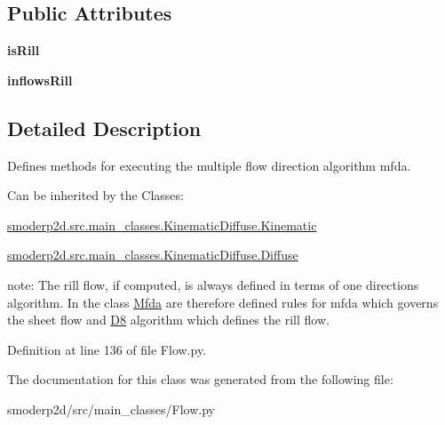 \subsection*{Public Attributes}
\begin{DoxyCompactItemize}
\item 
\hypertarget{classsmoderp2d_1_1src_1_1main__classes_1_1Flow_1_1Mfda_ac4d6e378b98d5e570bccbcb1b67c7eb8}{{\bfseries is\-Rill}}\label{classsmoderp2d_1_1src_1_1main__classes_1_1Flow_1_1Mfda_ac4d6e378b98d5e570bccbcb1b67c7eb8}

\item 
\hypertarget{classsmoderp2d_1_1src_1_1main__classes_1_1Flow_1_1Mfda_aa001d3d609b92113c5291a6935a3fc54}{{\bfseries inflows\-Rill}}\label{classsmoderp2d_1_1src_1_1main__classes_1_1Flow_1_1Mfda_aa001d3d609b92113c5291a6935a3fc54}

\end{DoxyCompactItemize}


\subsection{Detailed Description}
Defines methods for executing the multiple flow direction algorithm mfda. 

Can be inherited by the Classes\-:


\begin{DoxyItemize}
\item \hyperlink{classsmoderp2d_1_1src_1_1main__classes_1_1KinematicDiffuse_1_1Kinematic}{smoderp2d.\-src.\-main\-\_\-classes.\-Kinematic\-Diffuse.\-Kinematic}
\item \hyperlink{classsmoderp2d_1_1src_1_1main__classes_1_1KinematicDiffuse_1_1Diffuse}{smoderp2d.\-src.\-main\-\_\-classes.\-Kinematic\-Diffuse.\-Diffuse}
\end{DoxyItemize}

note\-: The rill flow, if computed, is always defined in terms of one directions algorithm. In the class \hyperlink{classsmoderp2d_1_1src_1_1main__classes_1_1Flow_1_1Mfda}{Mfda} are therefore defined rules for mfda which governs the sheet flow and \hyperlink{classsmoderp2d_1_1src_1_1main__classes_1_1Flow_1_1D8}{D8} algorithm which defines the rill flow. 

Definition at line 136 of file Flow.\-py.



The documentation for this class was generated from the following file\-:\begin{DoxyCompactItemize}
\item 
smoderp2d/src/main\-\_\-classes/Flow.\-py\end{DoxyCompactItemize}
